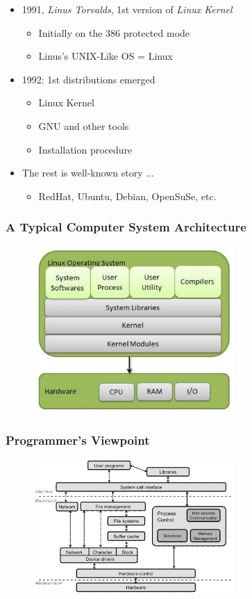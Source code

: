 \documentclass[red]{beamer}
\begin{document}
\begin{CJK*}{UTF8}{gbsn}
\begin{frame}
\begin{itemize}
    \item 1991, \emph{Linus Torvalds}, 1st version of \emph{Linux Kernel}
    \begin{itemize}
        \item Initially on the 386 protected mode
        \item Linus's UNIX-Like OS = Linux
    \end{itemize}
    \item 1992: 1st distributions emerged
    \begin{itemize}
        \item Linux Kernel
        \item GNU and other tools
        \item Installation procedure
    \end{itemize}
    \item The rest is well-known story ...
    \begin{itemize}
        \item RedHat, Ubuntu, Debian, OpenSuSe, etc.
    \end{itemize}
\end{itemize}
\end{frame}

\begin{frame}
\frametitle{A Typical Computer System Architecture}
\begin{figure}
  \includegraphics[width=3in]{images/system.jpg}
\end{figure}
\end{frame}

\begin{frame}
\frametitle{Programmer's Viewpoint}
\begin{figure}
  \includegraphics[width=3in]{images/os_structure.png}
\end{figure}
\end{frame}


\end{CJK*}
\end{document}
